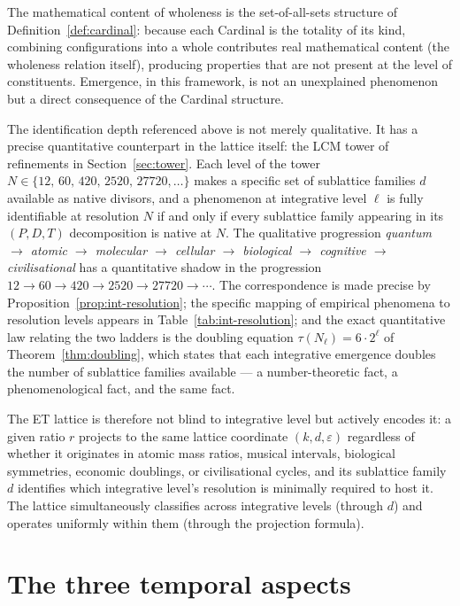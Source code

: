 \documentclass[11pt,a4paper]{article}
\theoremstyle{definition}
\theoremstyle{remark}
\begin{document}
The mathematical content of wholeness is the set-of-all-sets structure of Definition~\ref{def:cardinal}: because each Cardinal is the totality of its kind, combining configurations into a whole contributes real mathematical content (the wholeness relation itself), producing properties that are not present at the level of constituents. Emergence, in this framework, is not an unexplained phenomenon but a direct consequence of the Cardinal structure.

The identification depth referenced above is not merely qualitative. It has a precise quantitative counterpart in the lattice itself: the LCM tower of refinements in Section~\ref{sec:tower}. Each level of the tower $N \in \{12,\,60,\,420,\,2520,\,27720,\ldots\}$ makes a specific set of sublattice families $d$ available as native divisors, and a phenomenon at integrative level $\ell$ is fully identifiable at resolution $N$ if and only if every sublattice family appearing in its $(P,D,T)$ decomposition is native at $N$. The qualitative progression \emph{quantum $\to$ atomic $\to$ molecular $\to$ cellular $\to$ biological $\to$ cognitive $\to$ civilisational} has a quantitative shadow in the progression $12 \to 60 \to 420 \to 2520 \to 27720 \to \cdots$. The correspondence is made precise by Proposition~\ref{prop:int-resolution}; the specific mapping of empirical phenomena to resolution levels appears in Table~\ref{tab:int-resolution}; and the exact quantitative law relating the two ladders is the doubling equation $\tau(N_{\ell}) = 6\cdot 2^{\ell}$ of Theorem~\ref{thm:doubling}, which states that each integrative emergence doubles the number of sublattice families available --- a number-theoretic fact, a phenomenological fact, and the same fact.

The ET lattice is therefore not blind to integrative level but actively encodes it: a given ratio $r$ projects to the same lattice coordinate $(k,d,\varepsilon)$ regardless of whether it originates in atomic mass ratios, musical intervals, biological symmetries, economic doublings, or civilisational cycles, and its sublattice family $d$ identifies which integrative level's resolution is minimally required to host it. The lattice simultaneously classifies across integrative levels (through $d$) and operates uniformly within them (through the projection formula).

\section{The three temporal aspects}\label{sec:temporal}
\end{document}
